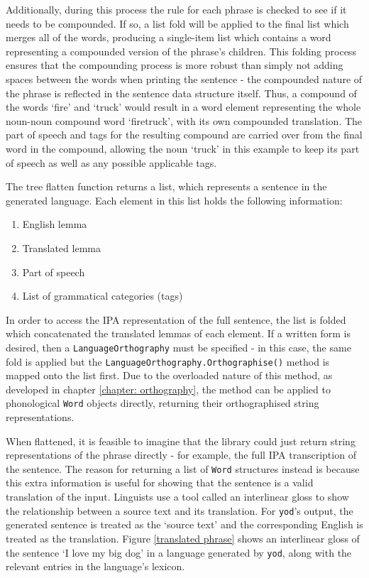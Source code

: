 \documentclass{report}
\begin{document}
	Additionally, during this process the rule for each phrase is checked to see if it needs to be compounded. If so, a list fold will be applied to the final list which merges all of the words, producing a single-item list which contains a word representing a compounded version of the phrase's children. This folding process ensures that the compounding process is more robust than simply not adding spaces between the words when printing the sentence - the compounded nature of the phrase is reflected in the sentence data structure itself. Thus, a compound of the words `fire' and `truck' would result in a word element representing the whole noun-noun compound word `firetruck', with its own compounded translation. The part of speech and tags for the resulting compound are carried over from the final word in the compound, allowing the noun `truck' in this example to keep its part of speech as well as any possible applicable tags.
	
	The tree flatten function returns a list, which represents a sentence in the generated language. Each element in this list holds the following information:
	\begin{enumerate}
		\item English lemma
		\item Translated lemma
		\item Part of speech
		\item List of grammatical categories (tags)
	\end{enumerate}

	In order to access the IPA representation of the full sentence, the list is folded which concatenated the translated lemmas of each element. If a written form is desired, then a \texttt{LanguageOrthography} must be specified - in this case, the same fold is applied but the \texttt{LanguageOrthography.Orthographise()} method is mapped onto the list first. Due to the overloaded nature of this method, as developed in chapter \ref{chapter: orthography}, the method can be applied to phonological \texttt{Word} objects directly, returning their orthographised string representations.

	When flattened, it is feasible to imagine that the library could just return string representations of the phrase directly - for example, the full IPA transcription of the sentence. The reason for returning a list of \texttt{Word} structures instead is because this extra information is useful for showing that the sentence is a valid translation of the input. Linguists use a tool called an interlinear gloss to show the relationship between a source text and its translation\cite{bickel2008leipzig}. For \texttt{yod}'s output, the generated sentence is treated as the `source text' and the corresponding English is treated as the translation. Figure \ref{translated phrase} shows an interlinear gloss of the sentence `I love my big dog' in a language generated by \texttt{yod}, along with the relevant entries in the language's lexicon. 
	
\end{document}
